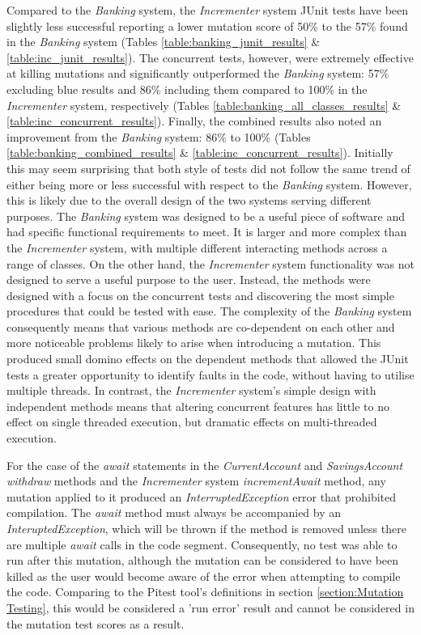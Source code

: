 \documentclass[a4paper,12pt]{article}
\begin{document}
Compared to the \textit{Banking} system, the \textit{Incrementer} system JUnit tests have been slightly less successful reporting a lower mutation score of 50\% to the 57\% found in the \textit{Banking} system (Tables \ref{table:banking_junit_results} \& \ref{table:inc_junit_results}). The concurrent tests, however, were extremely effective at killing mutations and significantly outperformed the \textit{Banking} system: 57\% excluding blue results and 86\% including them compared to 100\% in the \textit{Incrementer} system, respectively (Tables \ref{table:banking_all_classes_results} \& \ref{table:inc_concurrent_results}). Finally, the combined results also noted an improvement from the \textit{Banking} system: 86\% to 100\% (Tables \ref{table:banking_combined_results} \& \ref{table:inc_concurrent_results}). Initially this may seem surprising that both style of tests did not follow the same trend of either being more or less successful with respect to the \textit{Banking} system. However, this is likely due to the overall design of the two systems serving different purposes. The \textit{Banking} system was designed to be a useful piece of software and had specific functional requirements to meet. It is larger and more complex than the \textit{Incrementer} system, with multiple different interacting methods across a range of classes. On the other hand, the \textit{Incrementer} system functionality was not designed to serve a useful purpose to the user. Instead, the methods were designed with a focus on the concurrent tests and discovering the most simple procedures that could be tested with ease. The complexity of the \textit{Banking} system consequently means that various methods are co-dependent on each other and more noticeable problems likely to arise when introducing a mutation. This produced small domino effects on the dependent methods that allowed the JUnit tests a greater opportunity to identify faults in the code, without having to utilise multiple threads. In contrast, the \textit{Incrementer} system's simple design with independent methods means that altering concurrent features has little to no effect on single threaded execution, but dramatic effects on multi-threaded execution.

For the case of the \textit{await} statements in the \textit{CurrentAccount} and \textit{SavingsAccount withdraw} methods and the \textit{Incrementer} system \textit{incrementAwait} method, any mutation applied to it produced an \textit{InterruptedException} error that prohibited compilation. The \textit{await} method must always be accompanied by an \textit{InteruptedException}, which will be thrown if the method is removed unless there are multiple \textit{await} calls in the code segment. Consequently, no test was able to run after this mutation, although the mutation can be considered to have been killed as the user would become aware of the error when attempting to compile the code. Comparing to the Pitest tool's definitions in section \ref{section:Mutation Testing}, this would be considered a 'run error' result and cannot be considered in the mutation test scores as a result. 
\end{document}
